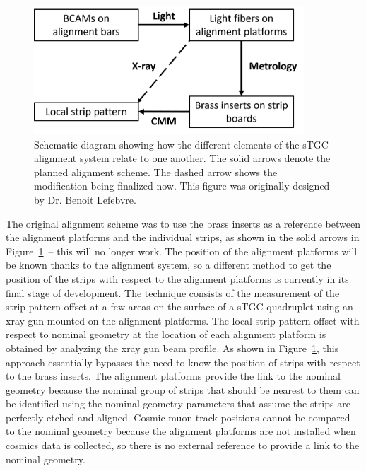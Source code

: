 \begin{figure}
    \centering
    \includegraphics[width = 0.9\textwidth]{figures/alignment_system_element_relations.png}
    \caption{Schematic diagram showing how the different elements of the sTGC alignment system relate to one another. The solid arrows denote the planned alignment scheme. The dashed arrow shows the modification being finalized now. This figure was originally designed by Dr. Benoit Lefebvre.}
    \label{fig:alignment_elements}
\end{figure}

The original alignment scheme was to use the brass inserts as a reference between the alignment platforms and the individual strips, as shown in the solid arrows in Figure~\ref{fig:alignment_elements}~-- this will no longer work. The position of the alignment platforms will be known thanks to the alignment system, so a different method to get the position of the strips with respect to the alignment platforms is currently in its final stage of development. The technique consists of the measurement of the strip pattern offset at a few areas on the surface of a sTGC quadruplet using an xray gun mounted on the alignment platforms. The local strip pattern offset with respect to nominal geometry at the location of each alignment platform is obtained by analyzing the xray gun beam profile. As shown in Figure~\ref{fig:alignment_elements}, this approach essentially bypasses the need to know the position of strips with respect to the brass inserts. The alignment platforms provide the link to the nominal geometry because the nominal group of strips that should be nearest to them can be identified using the nominal geometry parameters that assume the strips are perfectly etched and aligned. Cosmic muon track positions cannot be compared to the nominal geometry because the alignment platforms are not installed when cosmics data is collected, so there is no external reference to provide a link to the nominal geometry.

